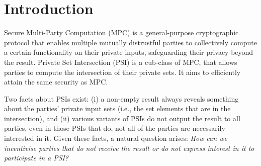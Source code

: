 



\vspace{-4.5mm}


\section{Introduction}

\vspace{-1mm}

Secure Multi-Party Computation (MPC) is a general-purpose cryptographic protocol that enables multiple mutually distrustful parties to collectively compute a certain functionality on their private inputs, safeguarding their privacy beyond the result. Private Set Intersection (PSI) is a cub-class of MPC, that allows parties to compute the intersection of their private sets. It aims to efficiently attain the same security as MPC.


%



Two facts about PSIs exist: (i) a non-empty result always reveals something about the parties' private input sets (i.e., the set elements that are in the intersection), and (ii) various variants of PSIs do not output the result to all parties, even in those PSIs that do,  not all of the parties are necessarily interested in it.  Given these facts, a natural question arises:   
%
\emph{How can we incentivise parties that do not receive the result or do not express interest in it to participate in a PSI?}


